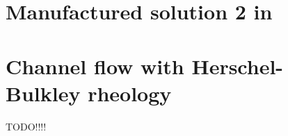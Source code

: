 \section{Manufactured solution 2 in \textcite{jolm17}  \label{ss:mms_jolm17}}


\section{Channel flow with Herschel-Bulkley rheology \label{ss:HBflow}}
 TODO!!!!



